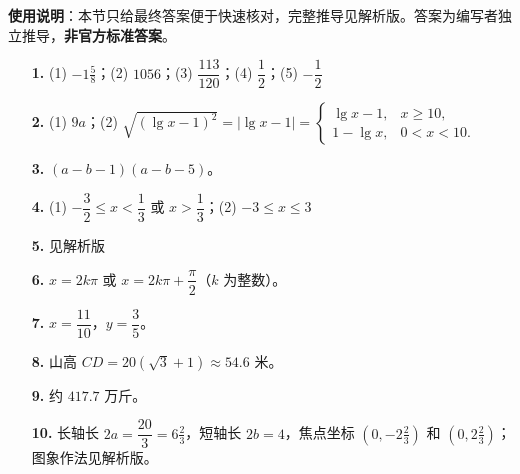 
\begin{gknotice}
\textbf{使用说明}：本节只给最终答案便于快速核对，完整推导见解析版。答案为编写者独立推导，\textbf{非官方标准答案}。
\end{gknotice}

\begin{itemize}[leftmargin=2.6em]
  \item[\textbf{1.}] (1) $-1\frac{5}{8}$；(2) $1056$；(3) $\dfrac{113}{120}$；(4) $\dfrac{1}{2}$；(5) $-\dfrac{1}{2}$
  \item[\textbf{2.}] (1) $9a$；(2) $\sqrt{(\lg x-1)^2}=|\lg x-1|=\begin{cases}\lg x-1,&x\ge10,\\[2pt]1-\lg x,&0<x<10.\end{cases}$
  \item[\textbf{3.}] $(a-b-1)(a-b-5)$。
  \item[\textbf{4.}] (1) $-\dfrac{3}{2}\le x<\dfrac{1}{3}$ 或 $x>\dfrac{1}{3}$；(2) $-3\le x\le3$
  \item[\textbf{5.}] 见解析版
  \item[\textbf{6.}] $x=2k\pi$ 或 $x=2k\pi+\dfrac{\pi}{2}$（$k$ 为整数）。
  \item[\textbf{7.}] $x=\dfrac{11}{10}$，$y=\dfrac{3}{5}$。
  \item[\textbf{8.}] 山高 $CD=20(\sqrt3+1)\approx54.6$ 米。
  \item[\textbf{9.}] 约 $417.7$ 万斤。
  \item[\textbf{10.}] 长轴长 $2a=\dfrac{20}{3}=6\frac{2}{3}$，短轴长 $2b=4$，焦点坐标 $(0,-2\frac{2}{3})$ 和 $(0,2\frac{2}{3})$；图象作法见解析版。
\end{itemize}

